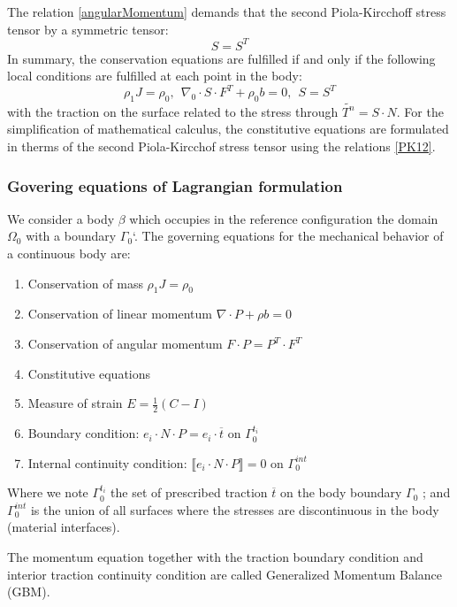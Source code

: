The relation \ref{angularMomentum} demands that the second Piola-Kircchoff stress tensor by a symmetric tensor:
\begin{equation}
S = S^T
\end{equation}
In summary, the conservation equations are fulfilled if and only if the following local conditions are fulfilled at each point in the body:
\begin{equation}
\rho_1 J = \rho_0, \ \ \nabla_0 \cdot S \cdot F^T + \rho_0 b =0, \ \ S=S^T 
\end{equation}
with the traction on the surface related to the stress through $\tilde{T^n} = S \cdot N$.
 For the simplification of mathematical calculus, the constitutive equations are formulated in therms of the second Piola-Kircchof stress tensor using the relations \ref{PK12}.

\subsubsection*{Govering equations of Lagrangian formulation} 
We consider a body $\beta$ which occupies in the reference configuration the domain $\Omega_0$ with a boundary $\Gamma_0$`. The governing equations for the mechanical behavior of a continuous body are:
\begin{enumerate}
\item Conservation of mass $\rho_1 J = \rho_0$
\item Conservation of linear momentum $\nabla \cdot P + \rho b = 0$
\item Conservation of angular momentum $F \cdot P = P^T \cdot F^T$
\item Constitutive equations
\item Measure of strain $E = \frac{1}{2} (C-I)$
\item Boundary condition: $e_i \cdot N \cdot P = e_i \cdot \overline{t}$ on $\Gamma_0^{t_i}$
\item Internal continuity condition: $\llbracket e_i \cdot N \cdot P \rrbracket = 0$ on $\Gamma_0^{int}$
\end{enumerate} 

Where we note $\Gamma_0^{t_i}$ the set of prescribed traction  $\overline{t}$ on the body boundary $\Gamma_0$ ; and $\Gamma_0^{int}$ is the union of all surfaces where the stresses are discontinuous in the body (material interfaces).

The momentum equation together with the traction boundary condition and interior traction continuity condition are called Generalized Momentum Balance (GBM).



